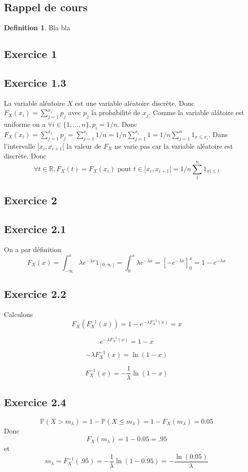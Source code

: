 \documentclass[]{book}
\theoremstyle{definition}
\newtheorem{defn}{Definition}
\newcommand{\bb}[1]{\mathbb{#1}}
\newcommand{\R}{\bb{R}}
\newcommand{\Pe}{\bb{P}}
\begin{document}
\subsection*{Rappel de cours}
\begin{defn}
Bla bla
\end{defn}



\newpage
\subsection*{Exercice 1}
\subsection*{Exercice 1.3}
La variable al\'eatoire $X$ est une variable al\'eatoire discr\`ete. Donc $F_X(x_i) = \sum_{j=1}^{x_i} p_j$ avec $p_j$ la probabilit\'e de $x_j$. Comme la variable al\'atoire est uniforme on a $\forall i \in \{1,\dots,n\}, p_i = 1/n$. Donc $F_X(x_i) = \sum_{j=1}^{x_i} p_j = \sum_{j=1}^{x_i} 1/n = 1/n \sum_{j=1}^{x_i} 1 = 1/n \sum_{j=1}^{n} 1_{x \leq x_i}$. Dans l'intervalle $[x_i, x_{i+1}[$ la valeur de $F_X$ ne varie pas car la variable al\'eatoire est discr\`ete. Donc
$$
\forall t \in \R, F_X(t) = F_X(x_i) \text{ pout } t \in [x_i, x_{i+1}[ = 1/n \sum_{1}^{n} 1_{xi \leq t}
$$  




\subsection*{Exercice 2}
\subsection*{Exercice 2.1}
On a par d\'efinition 
$$
F_X(x) = \int_{-\infty}^{x}{\lambda e^{-\lambda x} 1_{[0,\infty]}} = \int_{0}^{x}{\lambda e^{-\lambda x}} = \left[-e^{-\lambda x}\right]_{0}^{x} = 1 - e^{-\lambda x}
$$

\subsection*{Exercice 2.2}
Calculons 
$$
F_{X}(F_X^{-1}(x)) = 1 - e^{-\lambda F_X^{-1}(x)} = x
$$

$$
e^{-\lambda F_X^{-1}(x)} = 1-x
$$

$$
-\lambda F_X^{-1}(x) = \ln(1-x)
$$

$$
F_X^{-1}(x) = -\frac{1}{\lambda} \ln(1-x)
$$


\subsection*{Exercice 2.4}
$$
\Pe(X > m_{\lambda}) = 1 - \Pe(X \leq m_{\lambda}) = 1 - F_X(m_{\lambda}) = 0.05
$$
Donc
$$
F_X(m_{\lambda}) = 1 - 0.05 = .95
$$
et
$$
m_{\lambda} = F_X^{-1}(.95) = -\frac{1}{\lambda} \ln(1-0.95) = -\frac{\ln(0.05)}{\lambda}
$$
\end{document}
